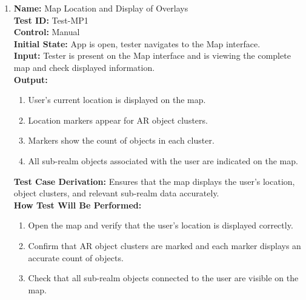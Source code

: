 \documentclass[12pt, titlepage]{article}
\begin{document}
\begin{enumerate}

  \item \textbf{Name:} Map Location and Display of Overlays \label{itm:Test-MP1} \\
        \textbf{Test ID:} Test-MP1 \\
        \textbf{Control:} Manual \\
        \textbf{Initial State:} App is open, tester navigates to the Map interface. \\
        \textbf{Input:} Tester is present on the Map interface and is viewing the complete map and check displayed information. \\
        \textbf{Output:}
        \begin{enumerate}
          \item User's current location is displayed on the map.
          \item Location markers appear for AR object clusters.
          \item Markers show the count of objects in each cluster.
          \item All sub-realm objects associated with the user are indicated on the map.
        \end{enumerate}
        \textbf{Test Case Derivation:} Ensures that the map displays the user's location, object clusters, and relevant sub-realm data accurately. \\
        \textbf{How Test Will Be Performed:}
        \begin{enumerate}
          \item Open the map and verify that the user's location is displayed correctly.
          \item Confirm that AR object clusters are marked and each marker displays an accurate count of objects.
          \item Check that all sub-realm objects connected to the user are visible on the map.
        \end{enumerate}


\end{enumerate}
\end{document}
